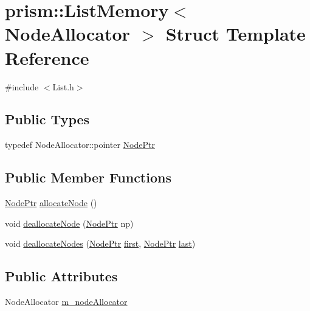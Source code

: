 \hypertarget{structprism_1_1_list_memory}{}\section{prism\+:\+:List\+Memory$<$ Node\+Allocator $>$ Struct Template Reference}
\label{structprism_1_1_list_memory}


{\ttfamily \#include $<$List.\+h$>$}

\subsection*{Public Types}
\begin{DoxyCompactItemize}
\item 
typedef Node\+Allocator\+::pointer \hyperlink{structprism_1_1_list_memory_a9e7b9eaaf60c96090da1d52221a944f1}{Node\+Ptr}
\end{DoxyCompactItemize}
\subsection*{Public Member Functions}
\begin{DoxyCompactItemize}
\item 
\hyperlink{structprism_1_1_list_memory_a9e7b9eaaf60c96090da1d52221a944f1}{Node\+Ptr} \hyperlink{structprism_1_1_list_memory_a3becac9851123f78b06efeaf25cb09f1}{allocate\+Node} ()
\item 
void \hyperlink{structprism_1_1_list_memory_afc9d0b7ac9c4a7af6c0430780c0cf02c}{deallocate\+Node} (\hyperlink{structprism_1_1_list_memory_a9e7b9eaaf60c96090da1d52221a944f1}{Node\+Ptr} np)
\item 
void \hyperlink{structprism_1_1_list_memory_aff3dc132e9cb4f03f1a16fde5a3b5534}{deallocate\+Nodes} (\hyperlink{structprism_1_1_list_memory_a9e7b9eaaf60c96090da1d52221a944f1}{Node\+Ptr} \hyperlink{namespaceprism_ae3fb7a1926a9e8e59300cd5e370470da}{first}, \hyperlink{structprism_1_1_list_memory_a9e7b9eaaf60c96090da1d52221a944f1}{Node\+Ptr} \hyperlink{namespaceprism_abe4956c4e865f55ca126b7fb973b5078}{last})
\end{DoxyCompactItemize}
\subsection*{Public Attributes}
\begin{DoxyCompactItemize}
\item 
Node\+Allocator \hyperlink{structprism_1_1_list_memory_a6e7929b4c99750b7f05c23f917ce03fe}{m\+\_\+node\+Allocator}
\end{DoxyCompactItemize}



